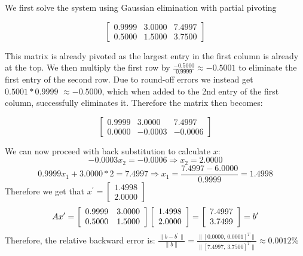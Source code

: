 \documentclass[12pt,letterpaper,reqno]{amsart}
\begin{document}
\begin{enumerate}
\begin{flushleft}
We first solve the system using Gaussian elimination with partial pivoting

$$\left[ \begin{array}{cc|c}{ 0.9999} & {3.0000} & {7.4997} \\ {0.5000} & {1.5000} & {3.7500}\end{array}\right]$$

This matrix is already pivoted as the largest entry in the first column is already at the top. We then multiply the first row by $\frac{-0.5000}{0.9999} \approx -0.5001$ to eliminate the first entry of the second row. Due to round-off errors we instead get $0.5001 * 0.9999$ $\approx -0.5000$, which when added to the 2nd entry of the first column, successfully eliminates it. Therefore the matrix then becomes:

$$\left[ \begin{array}{cc|c}{ 0.9999} & {3.0000} & {7.4997} \\ {0.0000} & {-0.0003} & {-0.0006}\end{array}\right]$$

We can now proceed with back substitution to calculate $x$:
$$-0.0003 x_2 = -0.0006 \Rightarrow x_2 = 2.0000$$
$$0.9999 x_1 + 3.0000 * 2 = 7.4997 \Rightarrow x_1 = \frac{7.4997- 6.0000}{0.9999} = 1.4998$$
Therefore we get that $x^\prime = \left[\begin{array} { l } {1.4998} \\ {2.0000} \end{array}\right]$
$$Ax^\prime = \left[\begin{array} { l l } { 0.9999 } & { 3.0000 } \\ { 0.5000 } & { 1.5000 } \end{array}\right]\left[\begin{array} { l } {1.4998} \\ {2.0000} \end{array}\right] = \left[\begin{array} { l } {7.4997} \\ {3.7499} \end{array}\right] = b^\prime$$
Therefore, the relative backward error is: $\frac{\|b - b^\prime \|}{\|b\|} = \frac{\|[0.0000,\, 0.0001]^T\|}{\|[7.4997,\, 3.7500]^T\|} \approx 0.0012\%$
\newline


\end{flushleft}
\end{enumerate}
\end{document}
